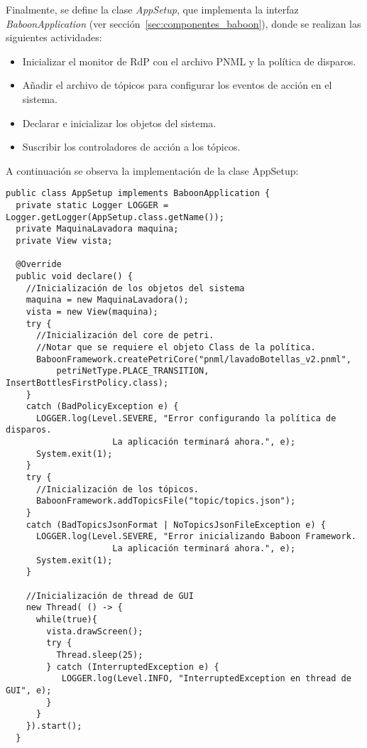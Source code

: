 Finalmente, se define la clase \emph{AppSetup}, que implementa la interfaz
\emph{BaboonApplication} (ver sección~\ref{sec:componentes_baboon}), donde se
realizan las siguientes actividades:
\begin{itemize}
  \item Inicializar el monitor de RdP con el archivo PNML y la política de
  disparos.
  \item Añadir el archivo de tópicos para configurar los eventos de acción en
  el sistema.
  \item Declarar e inicializar los objetos del sistema.
  \item Suscribir los controladores de acción a los tópicos.
\end{itemize} 

A continuación se observa la implementación de la clase AppSetup:

\begin{verbatim}
public class AppSetup implements BaboonApplication {
  private static Logger LOGGER = Logger.getLogger(AppSetup.class.getName());
  private MaquinaLavadora maquina;
  private View vista;

  @Override
  public void declare() {
    //Inicialización de los objetos del sistema
    maquina = new MaquinaLavadora();
    vista = new View(maquina);
    try {
      //Inicialización del core de petri.
      //Notar que se requiere el objeto Class de la política.
      BaboonFramework.createPetriCore("pnml/lavadoBotellas_v2.pnml",
          petriNetType.PLACE_TRANSITION, InsertBottlesFirstPolicy.class);
    } 
    catch (BadPolicyException e) {
      LOGGER.log(Level.SEVERE, "Error configurando la política de disparos.
                     La aplicación terminará ahora.", e);
      System.exit(1);
    }
    try {
      //Inicialización de los tópicos.
      BaboonFramework.addTopicsFile("topic/topics.json");
    } 
    catch (BadTopicsJsonFormat | NoTopicsJsonFileException e) {
      LOGGER.log(Level.SEVERE, "Error inicializando Baboon Framework.
                     La aplicación terminará ahora.", e);
      System.exit(1);
    }

    //Inicialización de thread de GUI
    new Thread( () -> {
      while(true){
        vista.drawScreen();
        try {
          Thread.sleep(25);
        } catch (InterruptedException e) {
           LOGGER.log(Level.INFO, "InterruptedException en thread de GUI", e);
        }
      }
    }).start();
  }

\end{verbatim}

